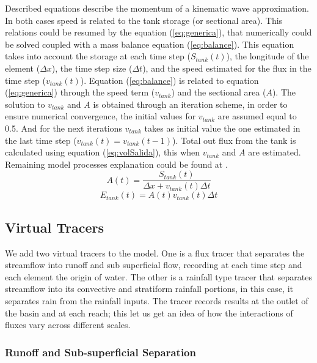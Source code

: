 {Described equations describe the momentum of a kinematic wave approximation. In both cases speed is related to the tank storage (or sectional area). This relations could be resumed by the equation (\ref{eq:generica}),  that numerically could be solved coupled with a mass balance equation (\ref{eq:balance}). This equation takes into account the storage at each time step ($S_{tank}(t)$), the longitude of the element ($\Delta x$), the time step size ($\Delta t$), and the speed estimated for the flux in the time step ($v_{tank}(t)$).  Equation (\ref{eq:balance}) is related to equation (\ref{eq:generica}) through the speed term ($v_{tank}$) and the sectional area ($A$).  The solution to $v_{tank}$ and $A$ is obtained through an iteration scheme, in order to ensure numerical convergence, the initial values for $v_{tank}$ are assumed equal to 0.5. And for the next iterations $v_{tank}$ takes as initial value the one estimated in the last time step ($v_{tank}(t) = v_{tank}(t-1)$).  Total out flux from the tank is calculated using equation (\ref{eq:volSalida}), this when $v_{tank}$ and $A$ are estimated.  Remaining model processes explanation could be found at \citet{Frances2007b}.\\

\begin{equation}
 A(t) = \frac{S_{tank}(t)}{\Delta x + v_{tank}(t) \Delta t}
    \label{eq:balance}
\end{equation}
\begin{equation}
    E_{tank}(t) =  A(t) v_{tank}(t) \Delta t
     \label{eq:volSalida}
\end{equation}

\subsection{Virtual Tracers}

We add two virtual tracers to the model.  One is a flux tracer that separates the streamflow into runoff and sub superficial flow, recording at each time step and each element the origin of water. The other is a rainfall type tracer that separates streamflow into its convective and stratiform rainfall portions, in this case, it separates rain from the rainfall inputs.  The tracer records results at the outlet of the basin and at each reach; this let us get an idea of how the interactions of fluxes vary across different scales.\\

\subsubsection{Runoff and Sub-superficial Separation}

}
